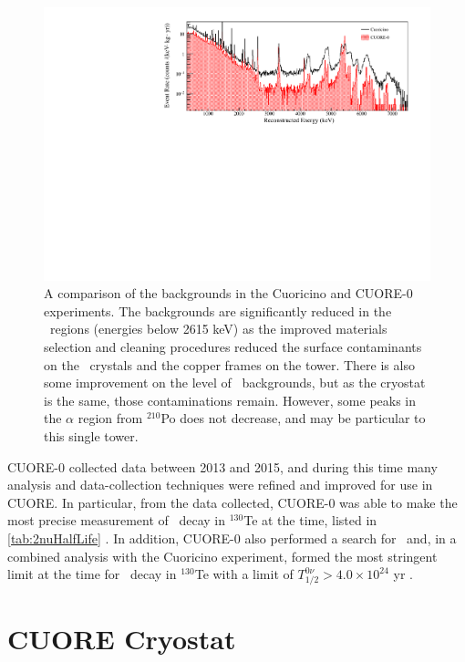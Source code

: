 \begin{figure}[htpb]
    \centering
    \includegraphics[width=\linewidth]{Figures/CUORE-0_vs_Cuoricino.pdf}
    \caption[A comparison of the backgrounds in the Cuoricino and CUORE-0 exeperiments]
    {A comparison of the backgrounds in the Cuoricino and CUORE-0 experiments.
    The backgrounds are significantly reduced in the \gamma~regions (energies below 2615 keV) as the improved materials selection and cleaning procedures reduced the surface contaminants on the \teotwo~crystals and the copper frames on the tower.
    There is also some improvement on the level of \gamma~backgrounds, but as the cryostat is the same, those contaminations remain.
    However, some peaks in the $\alpha$ region from $^{210}$Po does not decrease, and may be particular to this single tower.}
    \label{fig:cuore-0_vs_cuoricino}
\end{figure}

CUORE-0 collected data between 2013 and 2015, and during this time many analysis and data-collection techniques were refined and improved for use in CUORE.
In particular, from the data collected, CUORE-0 was able to make the most precise measurement of \twonubb~decay in $^{130}$Te at the time, listed in \autoref{tab:2nuHalfLife} \cite{Alduino:2016vtd}.
In addition, CUORE-0 also performed a search for \zeronubb~and, in a combined analysis with the Cuoricino experiment, formed the most stringent limit at the time for \zeronubb~decay in $^{130}$Te with a limit of $T^{0ν}_{1/2}>4.0\times10^{24}$ yr \cite{Alfonso:2015wka}.

\section{CUORE Cryostat}
\label{sec:CUORE Cryostat}

